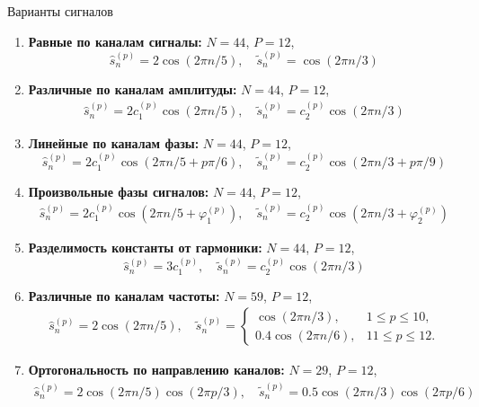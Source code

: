 \documentclass[pdf, unicode, 9pt, notheorems, handout]{beamer}
\begin{document}
    \begin{frame}{Варианты сигналов}
        \begin{enumerate}
            \item \textbf{Равные по каналам сигналы:} $N = 44$, $P = 12$,
            \begin{equation*}
                \hat{s}_n^{(p)} = 2 \cos(2 \pi n / 5), \quad \tilde{s}_n^{(p)} = \cos(2\pi n /3)
            \end{equation*}
            \item \textbf{Различные по каналам амплитуды:} $N = 44$, $P = 12$,
            \begin{gather*}
                \hat{s}_n^{(p)} = 2 c_1^{(p)} \cos(2 \pi n / 5), \quad \tilde{s}_n^{(p)} = c_2^{(p)}\cos(2\pi n /3)
            \end{gather*}
            \item \textbf{Линейные по каналам фазы:} $N = 44$, $P = 12$,
            \begin{equation*}
                \hat{s}_n^{(p)} = 2 c_1^{(p)} \cos(2 \pi n / 5 + p \pi / 6),
                \quad \tilde{s}_n^{(p)} = c_2^{(p)}\cos(2\pi n /3 + p \pi / 9)
            \end{equation*}
            \item \textbf{Произвольные фазы сигналов:} $N = 44$, $P = 12$,
            \begin{gather*}
                \hat{s}_n^{(p)} = 2 c_1^{(p)} \cos(2 \pi n / 5 + \varphi_1^{(p)}),
                \quad \tilde{s}_n^{(p)} = c_2^{(p)}\cos(2\pi n /3 + \varphi_2^{(p)})
            \end{gather*}
            \item \textbf{Разделимость константы от гармоники:} $N = 44$, $P = 12$,
            \begin{equation*}
                \hat{s}_n^{(p)} = 3 c_1^{(p)},
                \quad \tilde{s}_n^{(p)} = c_2^{(p)}\cos(2\pi n /3)
            \end{equation*}
            \item \textbf{Различные по каналам частоты:} $N = 59$, $P = 12$,
            \begin{gather*}
                \hat{s}_n^{(p)} = 2 \cos(2 \pi n / 5), \quad
                \tilde{s}_n^{(p)} = \begin{cases}
                    \cos(2\pi n /3), & 1 \leqslant p \leqslant 10,\\
                    0.4 \cos(2 \pi n / 6), & 11 \leqslant p \leqslant 12.
                \end{cases}
            \end{gather*}
            \item \textbf{Ортогональность по направлению каналов:} $N = 29$, $P = 12$,
            \begin{gather*}
                \hat{s}_n^{(p)} = 2 \cos(2 \pi n / 5) \cos(2 \pi p / 3), \quad
                \tilde{s}_n^{(p)} = 0.5 \cos(2\pi n /3) \cos(2 \pi p / 6)
            \end{gather*}
        \end{enumerate}
    \end{frame}
\end{document}
